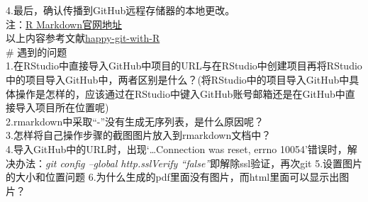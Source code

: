 \documentclass[
]{ctexart}
\begin{document}
4.最后，确认传播到GitHub远程存储器的本地更改。\\
注：\href{http://rmarkdown.rstudio.com}{R Markdown官网地址}\\
以上内容参考文献\href{https://happygitwithr.com/}{happy-git-with-R}\\
\# 遇到的问题\\
1.在RStudio中直接导入GitHub中项目的URL与在RStudio中创建项目再将RStudio中的项目导入GitHub中，两者区别是什么？(将RStudio中的项目导入GitHub中具体操作是怎样的，应该通过在RStudio中键入GitHub账号邮箱还是在GitHub中直接导入项目所在位置呢)\\
2.rmarkdown中采取``-''没有生成无序列表，是什么原因呢？\\
3.怎样将自己操作步骤的截图图片放入到rmarkdown文档中？\\
4.导入GitHub中的URL时，出现`\ldots Connection was reset, errno
10054'错误时，解决办法：\emph{git config --global http.sslVerify
``false''}即解除ssl验证，再次git 5.设置图片的大小和位置问题
6.为什么生成的pdf里面没有图片，而html里面可以显示出图片？
\end{document}
